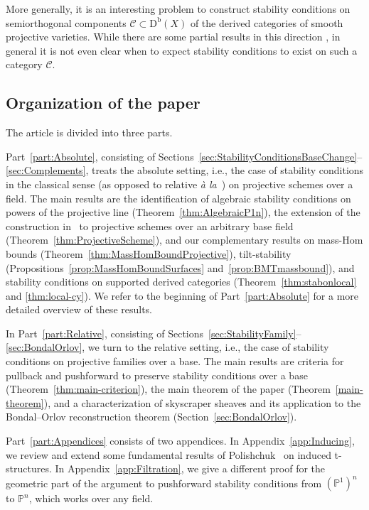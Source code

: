 \documentclass[11pt, reqno]{amsart}
\numberwithin{equation}{section}
\theoremstyle{plain}
\theoremstyle{remark}
\theoremstyle{definition}
\theoremstyle{italicsname}
\newcommand{\Db}{\mathrm{D^b}}
\newcommand{\cC}{\mathscr{C}}
\def\PP{\ensuremath{\mathbb{P}}}
\begin{document}
More generally, it is an interesting problem to construct stability conditions on semiorthogonal components $\cC \subset \Db(X)$ of the derived categories of smooth projective varieties. 
While there are some partial results in this direction \cite{BLMS, PPZ:GM, Peize-cubic-fivefolds, KLP}, 
in general it is not even clear when to expect stability conditions to exist on such a category $\cC$.

\subsection{Organization of the paper} 
The article is divided into three parts. 

Part~\ref{part:Absolute}, consisting of Sections~\ref{sec:StabilityConditionsBaseChange}--\ref{sec:Complements}, treats the absolute setting, i.e., the case of stability conditions in the classical sense (as opposed to relative \emph{\`{a} la}~\cite{stability-families}) on projective schemes over a field. 
The main results are the identification of algebraic stability conditions on powers of the projective line (Theorem~\ref{thm:AlgebraicP1n}), 
the extension of the construction in~\cite{chunyi-stability} to projective schemes over an arbitrary base field (Theorem~\ref{thm:ProjectiveScheme}), and our complementary results on mass-Hom bounds (Theorem~\ref{thm:MassHomBoundProjective}), tilt-stability (Propositions~\ref{prop:MassHomBoundSurfaces} and~\ref{prop:BMTmassbound}), and stability conditions on supported derived categories (Theorem~\ref{thm:stabonlocal} and \ref{thm:local-cy}). We refer to the beginning of Part~\ref{part:Absolute} for a more detailed overview of these results. 

In Part~\ref{part:Relative}, consisting of Sections~\ref{sec:StabilityFamily}--\ref{sec:BondalOrlov}, we turn to the relative setting, i.e., the case of stability conditions on projective families over a base. 
The main results are criteria for pullback and pushforward to preserve stability conditions over a base (Theorem~\ref{thm:main-criterion}), the main theorem of the paper (Theorem~\ref{main-theorem}), and a characterization of skyscraper sheaves and its application to the Bondal--Orlov reconstruction theorem (Section~\ref{sec:BondalOrlov}). 

Part~\ref{part:Appendices} consists of two appendices. 
In Appendix~\ref{app:Inducing}, we review and extend some fundamental results of Polishchuk~\cite{P-t-structures} on induced t-structures. 
In Appendix~\ref{app:Filtration}, we give a different proof for the geometric part of the argument to pushforward stability conditions from $(\PP^1)^n$ to $\PP^n$, which works over any field.
\end{document}
